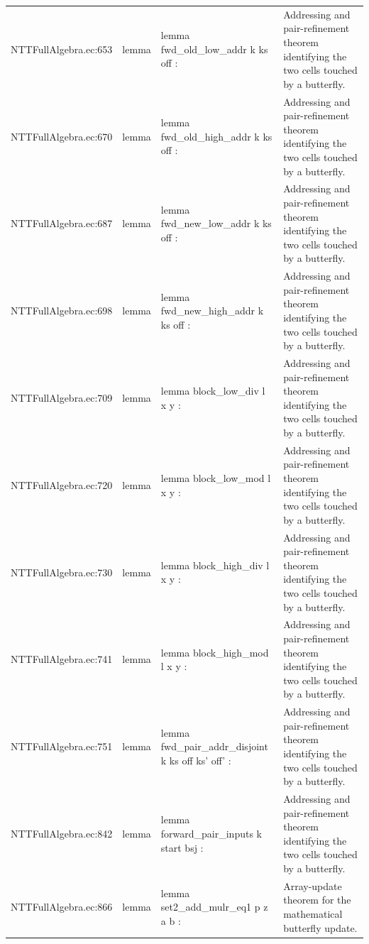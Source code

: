 \documentclass[10pt]{article}
\begin{document}
\begin{longtable}{L{0.11\textwidth}L{0.05\textwidth}L{0.38\textwidth}L{0.42\textwidth}}
NTTFullAlgebra.\allowbreak{}ec:\allowbreak{}653 & lemma & {\ttfamily\scriptsize lemma fwd\_old\_low\_addr k ks off :} & Addressing and pair-refinement theorem identifying the two cells touched by a butterfly. \\
NTTFullAlgebra.\allowbreak{}ec:\allowbreak{}670 & lemma & {\ttfamily\scriptsize lemma fwd\_old\_high\_addr k ks off :} & Addressing and pair-refinement theorem identifying the two cells touched by a butterfly. \\
NTTFullAlgebra.\allowbreak{}ec:\allowbreak{}687 & lemma & {\ttfamily\scriptsize lemma fwd\_new\_low\_addr k ks off :} & Addressing and pair-refinement theorem identifying the two cells touched by a butterfly. \\
NTTFullAlgebra.\allowbreak{}ec:\allowbreak{}698 & lemma & {\ttfamily\scriptsize lemma fwd\_new\_high\_addr k ks off :} & Addressing and pair-refinement theorem identifying the two cells touched by a butterfly. \\
NTTFullAlgebra.\allowbreak{}ec:\allowbreak{}709 & lemma & {\ttfamily\scriptsize lemma block\_low\_div l x y :} & Addressing and pair-refinement theorem identifying the two cells touched by a butterfly. \\
NTTFullAlgebra.\allowbreak{}ec:\allowbreak{}720 & lemma & {\ttfamily\scriptsize lemma block\_low\_mod l x y :} & Addressing and pair-refinement theorem identifying the two cells touched by a butterfly. \\
NTTFullAlgebra.\allowbreak{}ec:\allowbreak{}730 & lemma & {\ttfamily\scriptsize lemma block\_high\_div l x y :} & Addressing and pair-refinement theorem identifying the two cells touched by a butterfly. \\
NTTFullAlgebra.\allowbreak{}ec:\allowbreak{}741 & lemma & {\ttfamily\scriptsize lemma block\_high\_mod l x y :} & Addressing and pair-refinement theorem identifying the two cells touched by a butterfly. \\
NTTFullAlgebra.\allowbreak{}ec:\allowbreak{}751 & lemma & {\ttfamily\scriptsize lemma fwd\_pair\_addr\_disjoint k ks off ks' off' :} & Addressing and pair-refinement theorem identifying the two cells touched by a butterfly. \\
NTTFullAlgebra.\allowbreak{}ec:\allowbreak{}842 & lemma & {\ttfamily\scriptsize lemma forward\_pair\_inputs k start bsj :} & Addressing and pair-refinement theorem identifying the two cells touched by a butterfly. \\
NTTFullAlgebra.\allowbreak{}ec:\allowbreak{}866 & lemma & {\ttfamily\scriptsize lemma set2\_add\_mulr\_eq1 p z a b :} & Array-update theorem for the mathematical butterfly update. \\

\end{longtable}
\end{document}
